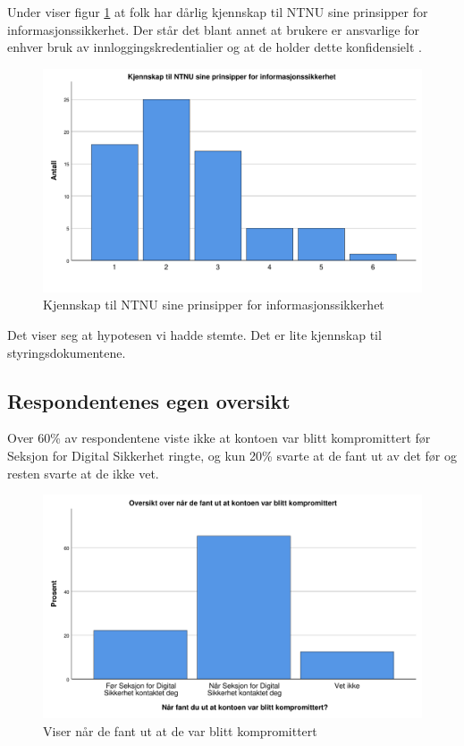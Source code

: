 Under viser figur \ref{fig:case2-InfoSecPolicy} at folk har dårlig kjennskap til NTNU sine prinsipper for informasjonssikkerhet. Der står det blant annet at brukere er ansvarlige for enhver bruk av innloggingskredentialier og at de holder dette konfidensielt \cite{PrinsInfoSec}. 
\begin{figure}[H]
    \centering
    \includegraphics[scale=0.5]{case_2/bilder/spss/InfoSecPolicy.pdf}
    \caption[Kjennskap til prinsipper for informasjonssikkerhet]{Kjennskap til NTNU sine prinsipper for informasjonssikkerhet}
    \label{fig:case2-InfoSecPolicy}
\end{figure}

Det viser seg at hypotesen vi hadde stemte. Det er lite kjennskap til styringsdokumentene.

\subsection{Respondentenes egen oversikt}
Over 60\% av respondentene viste ikke at kontoen var blitt kompromittert før Seksjon for Digital Sikkerhet ringte, og kun 20\% svarte at de fant ut av det før og resten svarte at de ikke vet.

\begin{figure}[H]
    \centering
    \includegraphics[scale=0.5]{case_2/bilder/spss/Fant_ut_kompromittert.pdf}
    \caption[Når de fant ut de var kompromittert]{Viser når de fant ut at de var blitt kompromittert}
    \label{fig:case2-fant-ut-kompromittert}
\end{figure}

